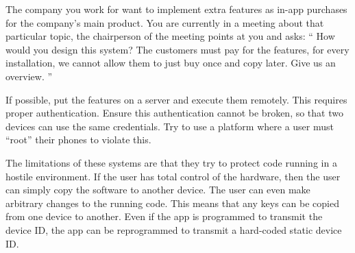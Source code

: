 \documentclass[a4paper,addpoints]{exam}
\begin{document}
\begin{questions}
  \question\label{q:trustcomp:C:A}
  The company you work for want to implement extra features as in-app purchases 
  for the company's main product.
  You are currently in a meeting about that particular topic, the chairperson 
  of the meeting points at you and asks:
  \enquote{%
    How would you design this system?
    The customers must pay for the features, for every installation, we cannot 
    allow them to just buy once and copy later.
    Give us an overview.
  }

  \begin{solution}
    If possible, put the features on a server and execute them remotely.
    This requires proper authentication.
    Ensure this authentication cannot be broken, so that two devices can use 
    the same credentials.
    Try to use a platform where a user must \enquote{root} their phones to 
    violate this.

    The limitations of these systems are that they try to protect code running 
    in a hostile environment.
    If the user has total control of the hardware, then the user can simply 
    copy the software to another device.
    The user can even make arbitrary changes to the running code.
    This means that any keys can be copied from one device to another.
    Even if the app is programmed to transmit the device ID, the app can be 
    reprogrammed to transmit a hard-coded static device ID\@.
  \end{solution}

\end{questions}


\printbibliography{}
\end{document}
